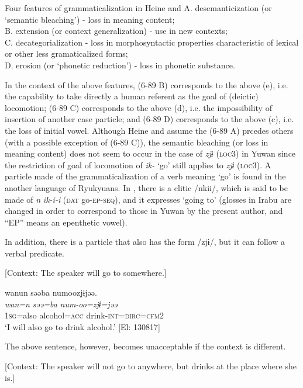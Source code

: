 \ea\label{ex:6-89}
 Four features of grammaticalization in Heine and \citet[2]{Kuteva2002}
A.  desemanticization (or ‘semantic bleaching’) - loss in meaning content;\\
B.  extension (or context generalization) - use in new contexts;\\
C.    decategorialization - loss in morphosyntactic properties characteristic of lexical or other less gramaticalized forms;\\
D.  erosion (or ‘phonetic reduction’) - loss in phonetic substance.
\z

In the context of the above features, (6-89 B) corresponds to the above (e), i.e. the capability to take directly a human referent as the goal of (deictic) locomotion; (6-89 C) corresponds to the above (d), i.e. the impossibility of insertion of another case particle; and (6-89 D) corresponds to the above (c), i.e. the loss of initial vowel. Although Heine and \citet[3]{Kuteva2002} assume the (6-89 A) prcedes others (with a possible exception of (6-89 C)), the semantic bleaching (or loss in meaning content) does not seem to occur in the case of \textit{zjɨ} (\textsc{loc3}) in Yuwan since the restriction of goal of locomotion of \textit{ik-} ‘go’ still applies to \textit{zjɨ} (\textsc{loc3}). A particle made of the grammaticalization of a verb meaning ‘go’ is found in the another language of Ryukyuans. In \citet[207]{Shimoji2008}, there is a clitic /nkii/, which is said to be made of \textit{n} \textit{ik-i-i} (\textsc{dat} go-\textsc{ep}-\textsc{seq}), and it expresses ‘going to’ (glosses in Irabu are changed in order to correspond to those in Yuwan by the present author, and “EP” means an epenthetic vowel).

  In addition, there is a particle that also has the form /zjɨ/, but it can follow a verbal predicate.

\ea\label{ex:6-90}
  [Context: The speaker will go to somewhere.]

{\TM}
\glll wanun  səəba  numoozjɨjəə.\\
\textit{wan=n}  \textit{səə=ba}  \textit{num-oo=zjɨ=jəə}\\
    1\textsc{sg}=also  alcohol=\textsc{acc}  drink-\textsc{int}=\textsc{dirc}=\textsc{cfm}2\\
\glt    ‘I will also go to drink alcohol.’ [El: 130817]
\z

The above sentence, however, becomes unacceptable if the context is different.

\ea\label{ex:6-91}
  [Context: The speaker will not go to anywhere, but drinks at the place where she is.]

